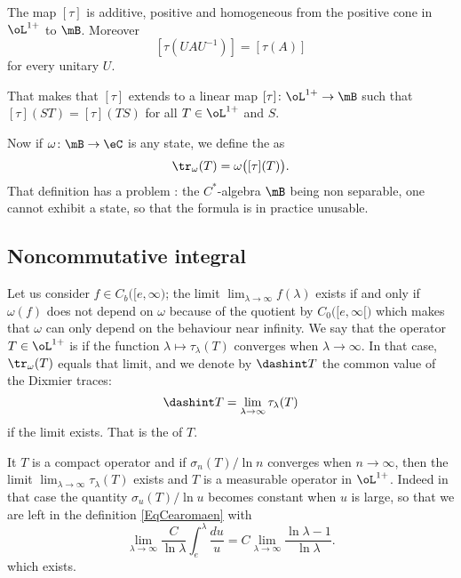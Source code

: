\begin{proposition}
The map $[\tau]$ is additive, positive and homogeneous from the positive cone in $\oL^{1+}$ to $\mB$. Moreover
\[ 
  [\tau(UAU^{-1})]=[\tau(A)]
\]
for every unitary $U$.
\end{proposition}
That makes that $[\tau]$ extends to a linear map $[\tau]\colon \oL^{1+}\to \mB$ such that $[\tau](ST)=[\tau](TS)$ for all $T\in\oL^{1+}$ and $S$.

Now if $\omega\colon \mB\to \eC$ is any state, we define the  as
\begin{equation}
\tr_{\omega}(T)=\omega\big( [\tau](T) \big).
\end{equation}
That definition has a problem : the $C^*$-algebra $\mB$ being non separable, one cannot exhibit a state, so that the formula is in practice unusable.

\subsection{Noncommutative integral}

Let us consider $f\in C_b\big( [e,\infty \big)$; the limit $\lim_{\lambda\to\infty}f(\lambda)$ exists if and only if $\omega(f)$ does not depend on $\omega$ because of the quotient by $C_0\big( [e,\infty[ \big)$ which makes that $\omega$ can only depend on the behaviour near infinity. We say that the operator $T\in\oL^{1+}$ is  if the function $\lambda\mapsto\tau_{\lambda}(T)$ converges when $\lambda\to\infty$. In that case, $\tr_{\omega}(T)$ equals that limit, and we denote by $\dashint T$ the common value of the Dixmier traces:
\begin{equation}
\dashint T=\lim_{\lambda\to\infty}\tau_{\lambda}(T)
\end{equation}
if the limit exists. That is the  of $T$.

It $T$ is a compact operator and if $\sigma_n(T)/\ln n$ converges when $n\to\infty$, then the limit $\lim_{\lambda\to\infty}\tau_{\lambda}(T)$ exists and $T$ is a measurable operator in $\oL^{1+}$. Indeed in that case the quantity $\sigma_u(T)/\ln u$ becomes constant when $u$ is large, so that we are left in the definition \eqref{EqCearomaen} with
\[ 
  \lim_{\lambda\to\infty}\frac{C}{ \ln\lambda }\int_e^{\lambda}\frac{ du }{ u }=C\lim_{\lambda\to\infty}\frac{ \ln\lambda-1 }{ \ln\lambda }.
\]
which exists.

